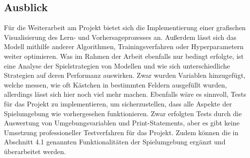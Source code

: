 \subsection{Ausblick}
Für die Weiterarbeit am Projekt bietet sich die Implementierung einer grafischen Visualisierung des Lern- und Vorhersageprozesses an. Außerdem lässt sich das Modell mithilfe anderer Algorithmen, Trainingsverfahren oder Hyperparametern weiter optimieren. Was im Rahmen der Arbeit ebenfalls nur bedingt erfolgte, ist eine Analyse der Spielstrategien von Modellen und wie sich unterschiedliche Strategien auf deren Performanz auswirken. Zwar wurden Variablen hinzugefügt, welche messen, wie oft Kästchen in bestimmten Feldern ausgefüllt wurden, allerdings lässt sich hier noch viel mehr machen. Ebenfalls wäre es sinnvoll, Tests für das Projekt zu implementieren, um sicherzustellen, dass alle Aspekte der Spielumgebung wie vorhergesehen funktionieren. Zwar erfolgten Tests durch die Auswertung von Umgebungsvariablen und Print-Statements, aber es gibt keine Umsetzung professioneller Testverfahren für das Projekt. Zudem können die in Abschnitt 4.1 genannten Funktionalitäten der Spielumgebung ergänzt und überarbeitet werden.
